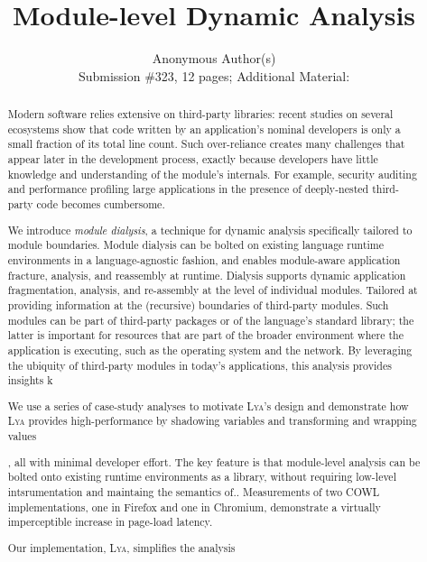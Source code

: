 \documentclass[letterpaper,twocolumn,10pt]{article}
\newcommand{\sys}{{\scshape Lya}\xspace}
\begin{document}

\date{}

\title{\Large \bf Module-level Dynamic Analysis}

\author{
{\rm Anonymous Author(s)}\\
Submission \#323, 12 pages; Additional Material:
}

\maketitle

\begin{abstract}
Modern software relies extensive on third-party libraries:
  recent studies on several ecosystems show that code written by an application's nominal developers is only a small fraction of its total line count.
Such over-reliance creates many challenges that appear later in the development process, exactly because developers have little knowledge and understanding of the module's internals.
For example, security auditing and performance profiling large applications in the presence of deeply-nested third-party code becomes cumbersome.

We introduce \emph{module dialysis}, a technique for dynamic analysis specifically tailored to module boundaries.
Module dialysis can be bolted on existing language runtime environments in a language-agnostic fashion, and enables module-aware application fracture, analysis, and reassembly at runtime.
Dialysis supports dynamic application fragmentation, analysis, and re-assembly at the level of individual modules.
Tailored at providing information at the (recursive) boundaries of third-party modules.
Such modules can be part of third-party packages or of the language's standard library;
  the latter is important for resources that are part of the broader environment where the application is executing, such as the operating system and the network.
By leveraging the ubiquity of third-party modules in today's applications, this analysis provides insights k

We use a series of case-study analyses to motivate \sys's design and demonstrate how \sys provides high-performance by shadowing variables and transforming and wrapping values

, all with minimal developer effort.
The key feature is that module-level analysis can be bolted onto existing runtime environments as a library, without requiring low-level intsrumentation and maintaing the semantics of..
Measurements of two COWL implementations, one in Firefox and one in Chromium, demonstrate a virtually imperceptible increase in page-load latency.

Our implementation, \sys, simplifies the analysis 

\end{abstract}
\end{document}
